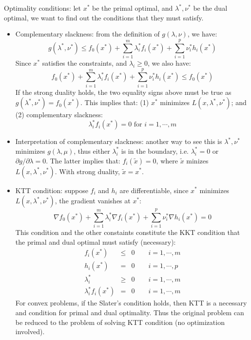 \documentclass{report}
\begin{document}
Optimality conditions: let $x^*$ be the primal optimal, and $\lambda^*, \nu^*$ be the dual optimal, we want to find out the conditions that they must satisfy. 
\begin{itemize}
\item Complementary slackness: from the definition of $g(\lambda, \nu)$, we have: 
\begin{equation}
g(\lambda^*, \nu^*) \leq f_0(x^*) + \sum_{i=1}^m \lambda_i^* f_i(x^*) + \sum_{i=1}^p \nu_i^* h_i(x^*)
\end{equation}
Since $x^*$ satisfies the constraints, and $\lambda_i \geq 0$, we also have: 
\begin{equation}
f_0(x^*) + \sum_{i=1}^m \lambda_i^* f_i(x^*) + \sum_{i=1}^p \nu_i^* h_i(x^*) \leq f_0(x^*)	
\end{equation}
If the strong duality holds, the two equality signs above must be true as $g(\lambda^*,\nu^*) = f_0(x^*)$. This implies that: (1) $x^*$ minimizes $L(x,\lambda^*,\nu^*)$; and (2) complementary slackness:
\begin{equation}
\lambda^*_i f_i(x^*) = 0 \text{ for } i = 1, \cdots, m	
\end{equation}

\item Interpretation of complementary slackness: another way to see this is $\lambda^*,\nu^*$ minimizes $g(\lambda,\mu)$, thus either $\lambda_i^*$ is in the boundary, i.e. $\lambda_i^* = 0$ or $\partial g/\partial \lambda = 0$. The latter implies that: $f_i(\tilde{x}) = 0$, where $\tilde{x}$ minizes $L(x,\lambda^*,\nu^*)$. With strong duality, $\tilde{x} = x^*$. 

\item KTT condition: suppose $f_i$ and $h_i$ are differentiable, since $x^*$ minimizes $L(x,\lambda^*,\nu^*)$, the gradient vanishes at $x^*$: 
\begin{equation}
\nabla f_0(x^*) + \sum_{i=1}^m \lambda_i^* \nabla f_i(x^*) + \sum_{i=1}^p \nu_i^* \nabla h_i(x^*) = 0
\end{equation}
This condition and the other constaints constitute the KKT condition that the primal and dual optimal must satisfy (necessary): 
\begin{equation}
\begin{array}{lll}
f_i(x^*) & \leq & 0 \qquad i = 1, \cdots, m\\
h_i(x^*) & = & 0 \qquad i = 1, \cdots, p\\
\lambda_i^* & \geq & 0 \qquad i = 1, \cdots, m\\
\lambda_i^* f_i(x^*) & = & 0 \qquad i = 1, \cdots, m
\end{array}	
\end{equation}
For convex problems, if the Slater's condition holds, then KTT is a necessary and condition for primal and dual optimality. Thus the original problem can be reduced to the problem of solving KTT condition (no optimization involved). 


\end{itemize}
\end{document}
